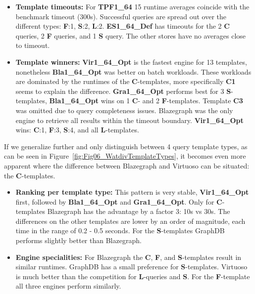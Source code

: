 \begin{itemize}
	\item \textbf{Template timeouts:} For \textbf{TPF1\_64} 15 runtime averages coincide with the benchmark timeout (300s). Successful queries are spread out over the different types: \textbf{F}:1, \textbf{S}:2, \textbf{L}:2.
	\textbf{ES1\_64\_Def} has timeouts for the 2 \textbf{C} queries,  2 \textbf{F} queries, and 1 \textbf{S} query. The other stores have no averages close to timeout.
	
	\item  \textbf{Template winners:} \textbf{Vir1\_64\_Opt} is the fastest engine for 13 templates, nonetheless \textbf{Bla1\_64\_Opt} was better on batch workloads. These workloads are dominated by the runtimes of the \textbf{C}-templates, more specifically \textbf{C1} seems to explain the difference. 
	\textbf{Gra1\_64\_Opt} performs best for 3 \textbf{S}-templates, \textbf{Bla1\_64\_Opt} wins on 1 \textbf{C}- and 2 \textbf{F}-templates. Template \textbf{C3} was omitted due to query completeness issues. Blazegraph was the only engine to retrieve all results within the timeout boundary.
	\textbf{Vir1\_64\_Opt} wins: \textbf{C}:1, \textbf{F}:3, \textbf{S}:4, and all \textbf{L}-templates.
\end{itemize}

If we generalize further and only distinguish between 4 query template types, as can be seen in Figure~\ref{fig:Fig06_WatdivTemplateTypes}, it becomes even more apparent where the difference between Blazegraph and Virtuoso can be situated: the \textbf{C}-templates.
\begin{itemize}
	\item \textbf{Ranking per template type:} This pattern is very stable, \textbf{Vir1\_64\_Opt} first, followed by \textbf{Bla1\_64\_Opt} and \textbf{Gra1\_64\_Opt}. Only for \textbf{C}-templates Blazegraph has the advantage  by a factor 3: 10s vs 30s. The differences on the other templates are lower by an order of magnitude, each time in the range of 0.2 - 0.5 seconds. For the \textbf{S}-templates GraphDB performs slightly better than Blazegraph.
	\item \textbf{Engine specialities:} For Blazegraph the \textbf{C}, \textbf{F}, and \textbf{S}-templates result in similar runtimes. GraphDB has a small preference for \textbf{S}-templates. Virtuoso is much better than the competition for \textbf{L}-queries and \textbf{S}. For the \textbf{F}-template all three engines perform similarly.
\end{itemize}